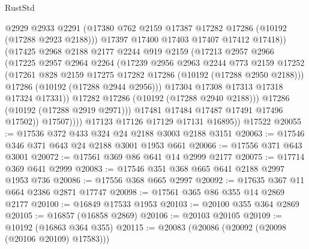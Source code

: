 \begin{lexlean}{RustStd}
\begin{coremodule}
                          @2929
                          @2933
                          @2291
                          (@17380 @762 @2159 @17387 @17282 @17286 (@10192 (@17288 @2923 @2188)))
                          @17397
                          @17400
                          @17403
                          @17407
                          @17412
                          @17418))
                      (@17425
                        @2968
                        @2188
                        @2177
                        @2244
                        @919
                        @2159
                        (@17213
                          @2957
                          @2966
                          (@17225
                            @2957
                            @2964
                            @2264
                            (@17239
                              @2956
                              @2963
                              @2244
                              @773
                              @2159
                              @17252
                              (@17261 @828 @2159 @17275 @17282 @17286 (@10192 (@17288 @2950 @2188)))
                              @17286
                              (@10192 (@17288 @2944 @2956)))
                            @17304
                            @17308
                            @17313
                            @17318
                            @17324
                            @17331))
                        @17282
                        @17286
                        (@10192 (@17288 @2940 @2188)))
                      @17286
                      (@10192 (@17288 @2919 @2971)))
                    @17481
                    @17484
                    @17487
                    @17491
                    @17496
                    @17502))
                @17507))))
        @17123
        @17126
        @17129
        @17131
        @16895))
    @17522
@20055 := @17536 @372 @433 @324 @24 @2188 @3003 @2188 @3151
@20063 := @17546 @346 @371 @643 @24 @2188 @3001 @1953 @661
@20066 := @17556 @371 @643 @3001
@20072 := @17561 @369 @86 @641 @14 @2999 @2177
@20075 := @17714 @369 @641 @2999
@20083 := @17546 @351 @368 @665 @641 @2188 @2997 @1953 @736
@20086 := @17556 @368 @665 @2997
@20092 := @17635 @367 @11 @664 @2386 @2871 @17747
@20098 := @17561 @365 @86 @355 @14 @2869 @2177
@20100 := @16849 @17533 @1953
@20103 := @20100 @355 @364 @2869
@20105 := @16857 (@16858 @2869)
@20106 := @20103 @20105
@20109 := @10192 (@16863 @364 @355)
@20115 := @20083 (@20086 (@20092 (@20098 (@20106 @20109) @17583)))

\end{coremodule}
\end{lexlean}
